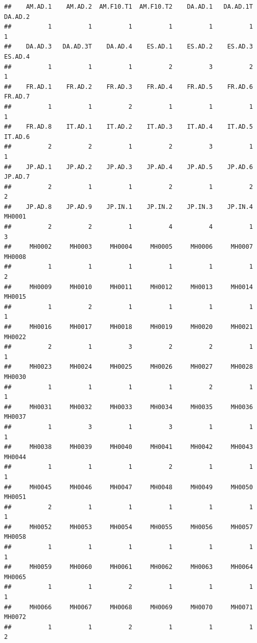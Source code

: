 \documentclass[
]{book}
\begin{document}
\begin{verbatim}
##    AM.AD.1    AM.AD.2  AM.F10.T1  AM.F10.T2    DA.AD.1   DA.AD.1T    DA.AD.2 
##          1          1          1          1          1          1          1 
##    DA.AD.3   DA.AD.3T    DA.AD.4    ES.AD.1    ES.AD.2    ES.AD.3    ES.AD.4 
##          1          1          1          2          3          2          1 
##    FR.AD.1    FR.AD.2    FR.AD.3    FR.AD.4    FR.AD.5    FR.AD.6    FR.AD.7 
##          1          1          2          1          1          1          1 
##    FR.AD.8    IT.AD.1    IT.AD.2    IT.AD.3    IT.AD.4    IT.AD.5    IT.AD.6 
##          2          2          1          2          3          1          1 
##    JP.AD.1    JP.AD.2    JP.AD.3    JP.AD.4    JP.AD.5    JP.AD.6    JP.AD.7 
##          2          1          1          2          1          2          2 
##    JP.AD.8    JP.AD.9    JP.IN.1    JP.IN.2    JP.IN.3    JP.IN.4     MH0001 
##          2          2          1          4          4          1          3 
##     MH0002     MH0003     MH0004     MH0005     MH0006     MH0007     MH0008 
##          1          1          1          1          1          1          2 
##     MH0009     MH0010     MH0011     MH0012     MH0013     MH0014     MH0015 
##          1          2          1          1          1          1          1 
##     MH0016     MH0017     MH0018     MH0019     MH0020     MH0021     MH0022 
##          2          1          3          2          2          1          1 
##     MH0023     MH0024     MH0025     MH0026     MH0027     MH0028     MH0030 
##          1          1          1          1          2          1          1 
##     MH0031     MH0032     MH0033     MH0034     MH0035     MH0036     MH0037 
##          1          3          1          3          1          1          1 
##     MH0038     MH0039     MH0040     MH0041     MH0042     MH0043     MH0044 
##          1          1          1          2          1          1          1 
##     MH0045     MH0046     MH0047     MH0048     MH0049     MH0050     MH0051 
##          2          1          1          1          1          1          1 
##     MH0052     MH0053     MH0054     MH0055     MH0056     MH0057     MH0058 
##          1          1          1          1          1          1          1 
##     MH0059     MH0060     MH0061     MH0062     MH0063     MH0064     MH0065 
##          1          1          2          1          1          1          1 
##     MH0066     MH0067     MH0068     MH0069     MH0070     MH0071     MH0072 
##          1          1          2          1          1          1          2 

\end{verbatim}
\end{document}
